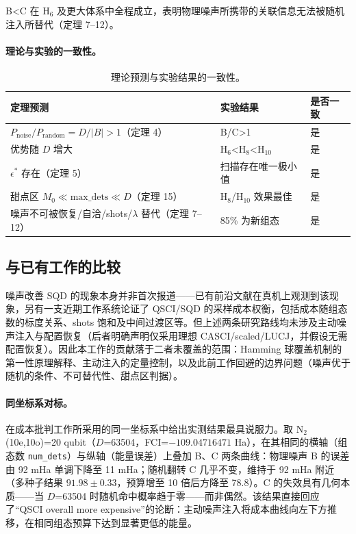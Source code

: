 \documentclass[UTF8,12pt,a4paper]{ctexart}
\newcommand{\Ntwo}{N$_2$}
\begin{document}
B<C 在 H$_6$ 及更大体系中全程成立，表明物理噪声所携带的关联信息无法被随机注入所替代（定理 7--12）。

\paragraph{理论与实验的一致性。}

\begin{table}[H]
\centering
\caption{理论预测与实验结果的一致性。}
\begin{tabular}{p{6.5cm}p{4cm}p{2cm}}
\toprule
定理预测 & 实验结果 & 是否一致 \\
\midrule
$P_{\text{noise}}/P_{\text{random}}=D/\lvert B\rvert>1$（定理 4） & B/C>1 & 是 \\
优势随 $D$ 增大 & H$_6$<H$_8$<H$_{10}$ & 是 \\
$\epsilon^*$ 存在（定理 5） & 扫描存在唯一极小值 & 是 \\
甜点区 $M_0\ll\text{max\_dets}\ll D$（定理 15） & H$_8$/H$_{10}$ 效果最佳 & 是 \\
噪声不可被恢复/自洽/shots/$\lambda$ 替代（定理 7--12） & 85\% 为新组态 & 是 \\
\bottomrule
\end{tabular}
\end{table}

\subsection{与已有工作的比较}

噪声改善 SQD 的现象本身并非首次报道——已有前沿文献在真机上观测到该现象，另有一支近期工作系统论证了 QSCI/SQD 的采样成本权衡，包括成本随组态数的标度关系、shots 饱和及中间过渡区等。但上述两条研究路线均未涉及主动噪声注入与配置恢复（后者明确声明仅采用理想 CASCI/scaled/LUCJ，并假设无需配置恢复）。因此本工作的贡献落于二者未覆盖的范围：Hamming 球覆盖机制的第一性原理解释、主动注入的定量控制，以及此前工作回避的边界问题（噪声优于随机的条件、不可替代性、甜点区判据）。

\paragraph{同坐标系对标。} 在成本批判工作所采用的同一坐标系中给出实测结果最具说服力。取 \Ntwo{}(10e,10o)=20 qubit（$D$=63504，FCI=$-109.04716471$ Ha），在其相同的横轴（组态数 \texttt{num\_dets}）与纵轴（能量误差）上叠加 B、C 两条曲线：物理噪声 B 的误差由 92 mHa 单调下降至 11 mHa；随机翻转 C 几乎不变，维持于 92 mHa 附近（多种子结果 $91.98\pm0.33$，预算增至 10 倍后方降至 78.8）。C 的失效具有几何本质——当 $D$=63504 时随机命中概率趋于零——而非偶然。该结果直接回应了``QSCI overall more expensive''的论断：主动噪声注入将成本曲线向左下方推移，在相同组态预算下达到显著更低的能量。
\end{document}
